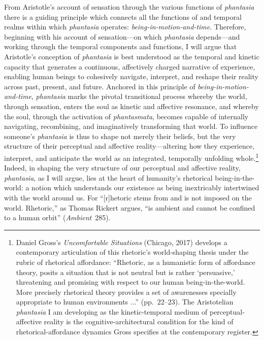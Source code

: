 From Aristotle's account of sensation through the various functions of \textit{phantasia} there is a guiding principle which connects all the functions of and temporal realms within which \textit{phantasia} operates: \textit{being-in-motion-and-time}. Therefore, beginning with his account of sensation---on which \textit{phantasia} depends---and working through the temporal components and functions, I will argue that Aristotle's conception of \textit{phantasia} is best understood as the temporal and kinetic capacity that generates a continuous, affectively charged narrative of experience, enabling human beings to cohesively navigate, interpret, and reshape their reality across past, present, and future. Anchored in this principle of \textit{being-in-motion-and-time}, \textit{phantasia} marks the pivotal transitional process whereby the world, through sensation, enters the soul as kinetic and affective resonance, and whereby the soul, through the activation of \textit{phantasmata}, becomes capable of internally navigating, recombining, and imaginatively transforming that world. To influence someone's \textit{phantasia} is thus to shape not merely their beliefs, but the very structure of their perceptual and affective reality---altering how they experience, interpret, and anticipate the world as an integrated, temporally unfolding whole.\footnote{Daniel Gross's \textit{Uncomfortable Situations} (Chicago, 2017) develops a contemporary articulation of this rhetoric's world-shaping thesis under the rubric of rhetorical affordance: ``Rhetoric, as a humanistic form of affordance theory, posits a situation that is not neutral but is rather `persuasive,' threatening and promising with respect to our human being-in-the-world. More precisely rhetorical theory provides a set of awarenesses specially appropriate to human environments ...'' (pp.~22--23). The Aristotelian \textit{phantasia} I am developing as the kinetic-temporal medium of perceptual-affective reality is the cognitive-architectural condition for the kind of rhetorical-affordance dynamics Gross specifies at the contemporary register.} Indeed, in shaping the very structure of our perceptual and affective reality, \textit{phantasia}, as I will argue, lies at the heart of humanity's rhetorical being-in-the-world: a notion which understands our existence as being inextricably intertwined with the world around us. For ``[r]hetoric stems from and is not imposed on the world. Rhetoric,'' as Thomas Rickert argues, ``is ambient and cannot be confined to a human orbit'' (\textit{Ambient}~285).


